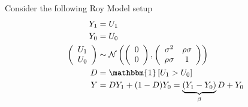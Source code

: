 \documentclass{article}
\begin{document}
Consider the following Roy Model setup
\textbf{\begin{align*}
\begin{aligned}
    Y_{1} &=U_{1} \\
    Y_{0} &=U_{0} \\
    \left(\begin{array}{c}
    U_{1} \\
    U_{0}
    \end{array}\right) & \sim \mathcal{N}\left(\left(\begin{array}{l}
    0 \\
    0
    \end{array}\right),\left(\begin{array}{cc}
    \sigma^{2} & \rho \sigma \\
    \rho \sigma & 1
    \end{array}\right)\right) \\
    D &=\mathbbm{1}\left[U_{1}>U_{0}\right] \\
    Y &=D Y_{1}+(1-D) Y_{0}=\underbrace{\left(Y_{1}-Y_{0}\right)}_{\beta} D+Y_{0}
\end{aligned}
\end{align*}}
\end{document}
